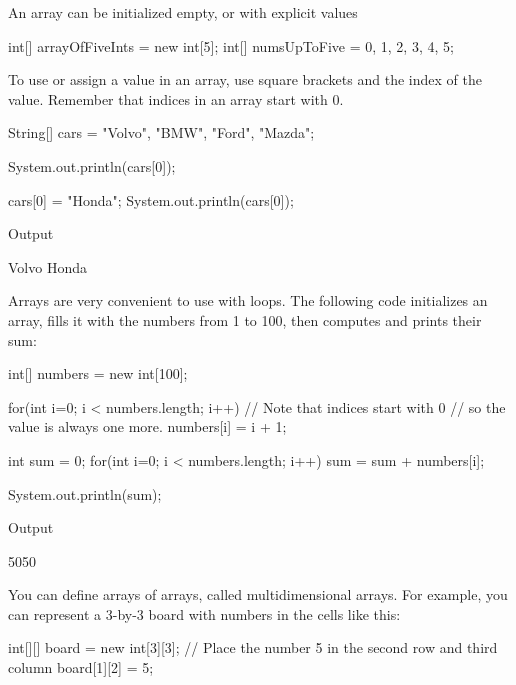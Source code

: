 An array can be initialized empty, or with explicit values

\begin{code}

int[] arrayOfFiveInts = new int[5];
int[] numsUpToFive = {0, 1, 2, 3, 4, 5};

\end{code}

To use or assign a value in an array, use square brackets and the index of the value. Remember that indices in an array start with 0.

\begin{code}

String[] cars = {"Volvo", "BMW", "Ford", "Mazda"};

System.out.println(cars[0]);

cars[0] = "Honda";
System.out.println(cars[0]);

\end{code}

Output
\begin{code}
Volvo
Honda
\end{code}

Arrays are very convenient to use with loops. The following code initializes an array, fills it with the numbers from 1 to 100, then computes and prints their sum:

\begin{code}

int[] numbers = new int[100];

for(int i=0; i < numbers.length; i++){
    // Note that indices start with 0
    // so the value is always one more. 
    numbers[i] = i + 1;
}

int sum = 0;
for(int i=0; i < numbers.length; i++){
    sum = sum + numbers[i];
}

System.out.println(sum);

\end{code}

Output
\begin{code}
5050
\end{code}

You can define arrays of arrays, called multidimensional arrays. For example, you can represent a 3-by-3 board with numbers in the cells like this:

\begin{code}

int[][] board = new int[3][3];
// Place the number 5 in the second row and third column
board[1][2] = 5; 

\end{code}

